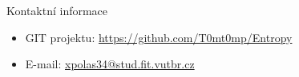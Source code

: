 \documentclass[final,hyperref={pdfpagelabels=false}]{beamer}
\begin{document}
\begin{frame}[t, fragile]
\begin{columns}[t]
\begin{column}{.465\textwidth}
\begin{block}{Kontaktní informace}
	\begin{itemize}
		\item GIT projektu: \href{https://github.com/T0mt0mp/Entropy}{https://github.com/T0mt0mp/Entropy}
		\item E-mail: \href{mailto:xpolas34@stud.fit.vutbr.cz}{xpolas34@stud.fit.vutbr.cz}
	\end{itemize}
	
\end{block}


\end{column} %

\begin{column}{.015\textwidth}\end{column} %

\end{columns} %

\end{frame} 

\end{document}
